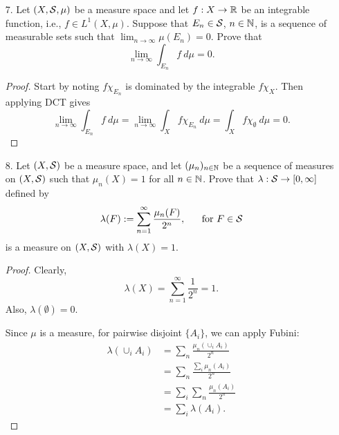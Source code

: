 \begin{itemize}
\item[7.] Let $(X, \mathcal{S}, \mu)$ be a measure space and let $f : X \rightarrow \mathbb{R}$ be an integrable
function, i.e., $f \in L^1 (X, \mu)$. Suppose that $E_n \in \mathcal{S}$, $n \in \mathbb{N}$, is a sequence of measurable sets such that $\lim_{n\rightarrow \infty} \mu(E_n) = 0$. Prove that
$$\lim_{n\rightarrow \infty} \int_{E_n} f \ d\mu = 0.$$
\begin{proof}
Start by noting $f \chi_{E_n}$ is dominated by the integrable $f \chi_{X}$. Then applying DCT gives 
$$\lim_{n\rightarrow \infty} \int_{E_n} f \ d\mu = \lim_{n\rightarrow \infty} \int_{X} f \chi_{E_n} \ d\mu = \int_{X} f \chi_{\emptyset} \ d\mu = 0.$$
\end{proof}









\item[8.] Let $(X, \mathcal{S})$ be a measure space, and let $(\mu_n)_{n\in\mathbb{N}}$ be a sequence of
measures on  $(X, \mathcal{S})$ such that $\mu_n(X) = 1$ for all $n\in\mathbb{N}$. Prove that $\lambda : \mathcal{S} \rightarrow [0,\infty]$ defined by
$$\lambda(F) := \sum_{n=1}^{\infty} \frac{\mu_n(F)}{2^n}, \ \ \ \ \text{ for } F\in\mathcal{S}$$
is a measure on $(X, \mathcal{S})$ with $\lambda(X) = 1$.
\begin{proof}
Clearly, $$\lambda(X) = \sum_{n=1}^{\infty} \frac{1}{2^n} = 1.$$
Also, $\lambda(\emptyset) = 0$. 

\medskip 

Since $\mu$ is a measure, for pairwise disjoint $\{A_i\}$, we can apply Fubini:
\begin{align*}
    \lambda \left(\cup_i A_i \right) &= \sum_{n} \frac{\mu_n\left(\cup_i A_i \right)}{2^n} \\
    &= \sum_{n} \frac{ \sum_{i} \mu_n(A_i)}{2^n} \\
    &= \sum_{i} \sum_{n} \frac{\mu_n(A_i)}{2^n} \\
    &= \sum_{i} \lambda(A_i).
\end{align*}

\end{proof}








\end{itemize}
